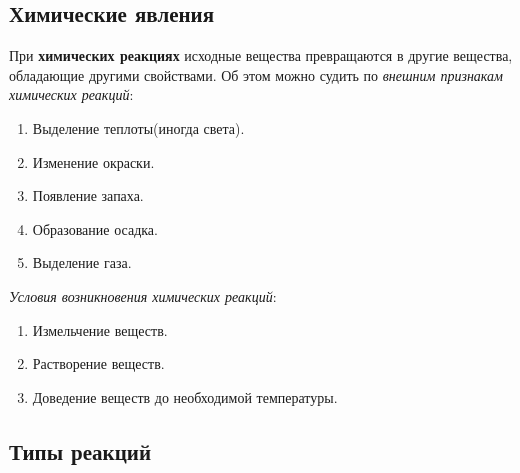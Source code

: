 \documentclass[12pt,a4paper]{article}
\begin{document}

\subsection{Химические явления}

При {\bfseries химических реакциях} исходные вещества превращаются в другие вещества, обладающие другими свойствами. Об этом можно судить по {\itshape внешним признакам химических реакций}:

\begin{enumerate}
\item Выделение теплоты(иногда света).
\item Изменение окраски.
\item Появление запаха.
\item Образование осадка.
\item Выделение газа.
\end{enumerate}

{\itshape Условия возникновения химических реакций}:

\begin{enumerate}
\item Измельчение веществ.
\item Растворение веществ.
\item Доведение веществ до необходимой температуры.
\end{enumerate}


\subsection{Типы реакций}
\end{document}
